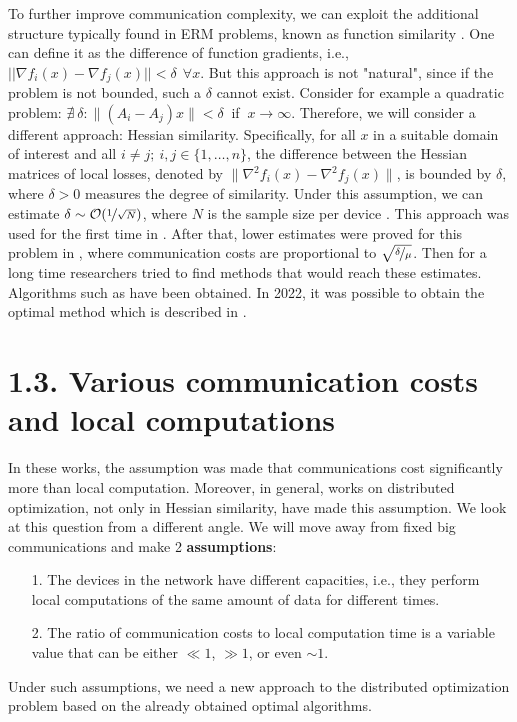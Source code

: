 \documentclass{article}
\theoremstyle{definition}
\theoremstyle{plain}
\begin{document}
To further improve communication complexity, we can exploit the additional structure typically found in ERM problems, known as function similarity \cite{arjevani2015communication, shamir2014communication, matsushima2014distributed}. One can define it as the difference of function gradients, i.e., $||\nabla f_i (x) - \nabla f_j (x)|| < \delta ~~  \forall x$. But this approach is not "natural", since if the problem is not bounded, such a $\delta$ cannot exist. Consider for example a quadratic problem: $\nexists~ \delta: \|(A_i - A_j)x\| < \delta~$  if $~ x\rightarrow \infty$. Therefore, we will consider a different approach: Hessian similarity. Specifically, for all $x$ in a suitable domain of interest and all $i \neq j; ~ i,j \in \{1,\ldots,n\}$, the difference between the Hessian matrices of local losses, denoted by $\|\nabla ^2 f_i(x) - \nabla ^2 f_j(x)\|$, is bounded by $\delta$, where $\delta > 0$ measures the degree of similarity. Under this assumption, we can estimate $\delta \sim \mathcal O(\nicefrac{1}{\sqrt{N}})$, where $N$ is the sample size per device \cite{arjevani2015communication}. This approach was used for the first time in \cite{shamir2014communication}.  After that, lower estimates were proved for this problem in \cite{arjevani2015communication}, where communication costs are proportional to $\sqrt{\nicefrac{\delta}{\mu}}$. Then for a long time researchers tried to find methods that would reach these estimates. Algorithms such as \cite{tian2022acceleration, sun2022distributed, reddi2016aide, hendrikx2020statistically, beznosikov2021distributed} have been obtained. In 2022, it was possible to obtain the optimal method which is described in \cite{kovalev2022optimal}. 

\section*{1.3. Various communication costs and local computations} \label{eq:1.3}

In these works, the assumption was made that communications cost significantly more than local computation. Moreover, in general, works on distributed optimization, not only in Hessian similarity, have made this assumption. We look at this question from a different angle. We will move away from fixed big communications and make 2 \textbf{assumptions}:
\begin{itemize}
    \item [1.] The devices in the network have different capacities, i.e., they perform local computations of the same amount of data for different times.
    \item [2.] The ratio of communication costs to local computation time is a variable value that can be either $\ll 1$, $\gg1$, or even $\sim 1$.
\end{itemize}
 Under such assumptions, we need a new approach to the distributed optimization problem based on the already obtained optimal algorithms.
\end{document}
